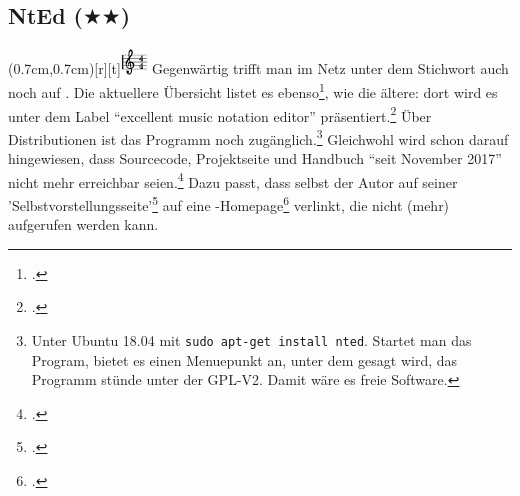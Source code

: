 %
%
%



\subsection{NtEd ($\bigstar$$\bigstar$)}


\parpic(0.7cm,0.7cm)[r][t]{\includegraphics[width=0.7cm]{logos/nted-300dpi.png}}
\label{NtEd}Gegenwärtig trifft man im Netz unter dem Stichwort
 auch noch auf . Die aktuellere Übersicht
listet es ebenso\footcite[vgl.][\nopage wp.]{WpedNotensatz2019a}, wie die ältere:
dort wird es unter dem Label \enquote{excellent music notation editor}
präsentiert.\footcite[vgl.][\nopage wp.]{LinuxSoundNotation2006a} Über
Distributionen ist das Programm noch zugänglich.\footnote{Unter Ubuntu 18.04 mit
\texttt{sudo apt-get install nted}. Startet man das Program, bietet es einen
Menuepunkt  an, unter dem gesagt wird, das Programm stünde unter der
GPL-V2. Damit wäre es freie Software.} Gleichwohl wird schon darauf
hingewiesen, dass Sourcecode, Projektseite und Handbuch \enquote{seit November
2017} nicht mehr erreichbar seien.\footcite[vgl.][\nopage wp.]{UbuntuNtEd2016a}
Dazu passt, dass selbst der Autor  auf seiner
'Selbstvorstellungsseite'\footcite[vgl.][\nopage wp.]{Andres2018a} auf eine
-Homepage\footcite[vgl.][\nopage wp.]{Andres2018b} verlinkt, die nicht
(mehr) aufgerufen werden kann.
 
